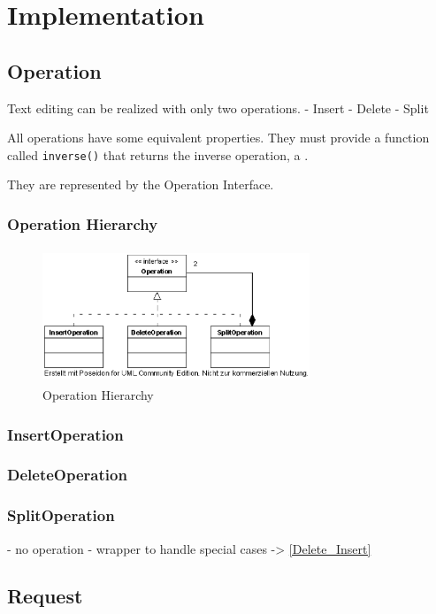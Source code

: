 
\section{Implementation}


\subsection{Operation}
Text editing can be realized with only two operations. 
 - Insert
 - Delete
 - Split

All operations have some equivalent properties. They must provide a function called \texttt{inverse()} that returns the inverse operation, a . 

They are represented by the Operation Interface.
 
\subsubsection{Operation Hierarchy}
\begin{figure}[H]
\centering
\includegraphics[height=4cm,width=8cm]{../../images/algo-impl/operation.eps}
\caption{Operation Hierarchy}
\end{figure}

\subsubsection{InsertOperation}


\subsubsection{DeleteOperation}
\subsubsection{SplitOperation}
\label{Split_Operation}
  - no operation
  - wrapper to handle special cases -> \ref{Delete_Insert}


\subsection{Request}


